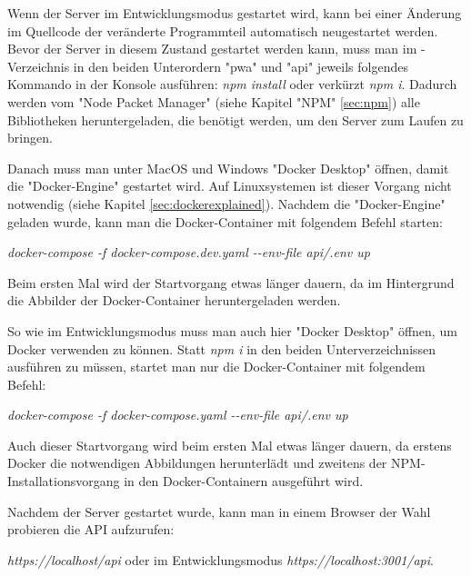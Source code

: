 
Wenn der Server im Entwicklungsmodus gestartet wird, kann bei einer Änderung im Quellcode der veränderte Programmteil automatisch neugestartet werden. Bevor der Server in diesem Zustand gestartet werden kann, muss man im \ZELIA-Verzeichnis in den beiden Unterordern "pwa" und "api" jeweils folgendes Kommando in der Konsole ausführen: \emph{npm install} oder verkürzt \emph{npm i}. Dadurch werden vom "Node Packet Manager" (siehe Kapitel "NPM" \ref{sec:npm}) alle Bibliotheken heruntergeladen, die benötigt werden, um den Server zum Laufen zu bringen.

Danach muss man unter MacOS und Windows "Docker Desktop" öffnen, damit die "Docker-Engine" gestartet wird. Auf Linuxsystemen ist dieser Vorgang nicht notwendig (siehe Kapitel \ref{sec:dockerexplained}). Nachdem die "Docker-Engine" geladen wurde, kann man die Docker-Container mit folgendem Befehl starten:

\emph{docker-compose -f docker-compose.dev.yaml -{}-env-file api/.env up}  

Beim ersten Mal wird der Startvorgang etwas länger dauern, da im Hintergrund die Abbilder der Docker-Container heruntergeladen werden.


So wie im Entwicklungsmodus muss man auch hier "Docker Desktop" öffnen, um Docker verwenden zu können. Statt \emph{npm i} in den beiden Unterverzeichnissen ausführen zu müssen, startet man nur die Docker-Container mit folgendem Befehl:

\emph{docker-compose -f docker-compose.yaml -{}-env-file api/.env up}

Auch dieser Startvorgang wird beim ersten Mal etwas länger dauern, da erstens Docker die notwendigen Abbildungen herunterlädt und zweitens der NPM-Installationsvorgang in den Docker-Containern ausgeführt wird.

Nachdem der Server gestartet wurde, kann man in einem Browser der Wahl probieren die API aufzurufen:

\emph{https://localhost/api} oder im Entwicklungsmodus \emph{https://localhost:3001/api}.